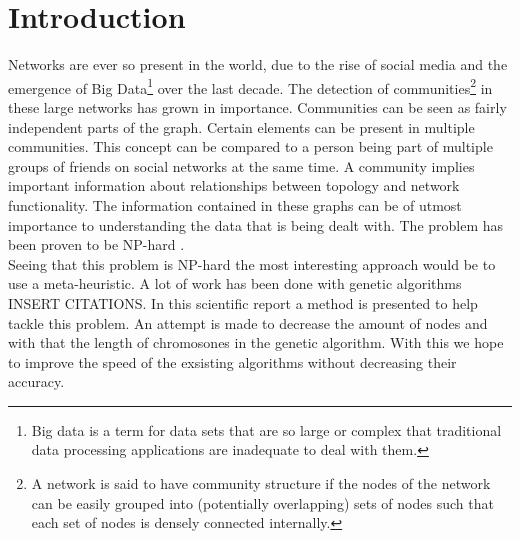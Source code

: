\section{Introduction}

Networks are ever so present in the world, due to the rise of social media and the emergence of Big Data\footnote{Big data is a term for data sets that are so large or complex that traditional data processing applications are inadequate to deal with them.} over the last decade.
The detection of communities\footnote{A network is said to have community structure if the nodes of the network can be easily grouped into (potentially overlapping) sets of nodes such that each set of nodes is densely connected internally.} in these large networks has grown in importance.
Communities can be seen as fairly independent parts of the graph.
Certain elements can be present in multiple communities.
This concept can be compared to a person being part of multiple groups of friends on social networks at the same time.
A community implies important information about relationships between topology and network functionality.
The information contained in these graphs can be of utmost importance to understanding the data that is being dealt with.
The problem has been proven to be NP-hard \cite{Fortunato2010}.\\

Seeing that this problem is NP-hard the most interesting approach would be to use a meta-heuristic.
A lot of work has been done with genetic algorithms INSERT CITATIONS.
In this scientific report a method is presented to help tackle this problem.
An attempt is made to decrease the amount of nodes and with that the length of chromosones in the genetic algorithm.
With this we hope to improve the speed of the exsisting algorithms without decreasing their accuracy.
